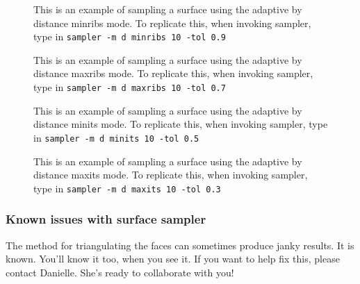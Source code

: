\begin{figure}[!htb]\centering
     \caption{This is an example of sampling a surface using the adaptive by distance minribs mode. To replicate this, when invoking sampler, type in {\tt sampler -m d minribs 10 -tol 0.9}}
\end{figure}

\begin{figure}[!htb]\centering
     \caption{This is an example of sampling a surface using the adaptive by distance maxribs mode. To replicate this, when invoking sampler, type in {\tt sampler -m d maxribs 10 -tol 0.7}}
\end{figure}


\begin{figure}[!htb]\centering
     \caption{This is an example of sampling a surface using the adaptive by distance minits mode. To replicate this, when invoking sampler, type in {\tt sampler -m d minits 10 -tol 0.5}}
\end{figure}


\begin{figure}[!htb]\centering
     \caption{This is an example of sampling a surface using the adaptive by distance maxits mode. To replicate this, when invoking sampler, type in {\tt sampler -m d maxits 10 -tol 0.3}}
\end{figure}





\subsubsection{Known issues with surface sampler}

The method for triangulating the faces can sometimes produce janky results.  It is known.   You'll know it too, when you see it.  If you want to help fix this, please contact Danielle.  She's ready to collaborate with you!

